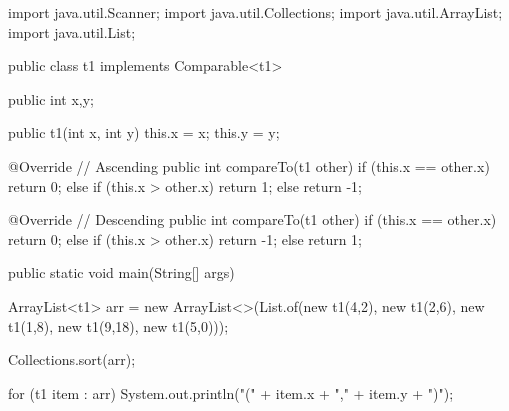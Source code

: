 \documentclass{report}
\begin{document}
    \pagebreak \bigbreak \noindent 
    \begin{javacode}
        import java.util.Scanner;
        import java.util.Collections;
        import java.util.ArrayList;
        import java.util.List;

        public class t1 implements Comparable<t1> {
            public int x,y;

            public t1(int x, int y) { this.x = x; this.y = y; }

            @Override
            // Ascending
            public int compareTo(t1 other) {
                if (this.x == other.x) return 0; 
                else if (this.x > other.x) return 1;
                else return -1;
            }

            @Override
            // Descending
            public int compareTo(t1 other) {
                if (this.x == other.x) return 0; 
                else if (this.x > other.x) return -1;
                else return 1;
            }

            public static void main(String[] args) {
                ArrayList<t1> arr = new ArrayList<>(List.of(new t1(4,2), new t1(2,6), new t1(1,8), new t1(9,18), new t1(5,0)));

                Collections.sort(arr);

                for (t1 item : arr) {
                    System.out.println("(" + item.x + "," + item.y + ")");
                }
            }
        }
    \end{javacode}

    \pagebreak 
\end{document}
